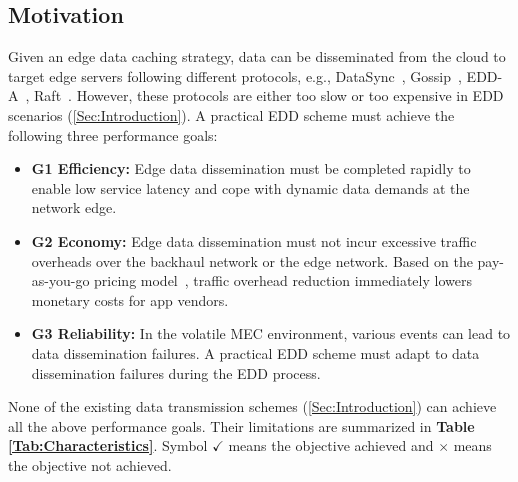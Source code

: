 \documentclass[10pt,journal,compsoc]{IEEEtran}
\begin{document}
\subsection{Motivation}
Given an edge data caching strategy, data can be disseminated from the cloud to target edge servers following different protocols, e.g., DataSync~\cite{datasync2018AWS}, Gossip~\cite{boyd2006randomized}, EDD-A~\cite{xia2021cost}, Raft~\cite{ongaro2014Raft}. However, these protocols are either too slow or too expensive in EDD scenarios (\cref{Sec:Introduction}). A practical EDD scheme must achieve the following three performance goals:
\begin{itemize}
    \item \textbf{G1 Efficiency:} Edge data dissemination must be completed rapidly to enable low service latency and cope with dynamic data demands at the network edge.
    \item \textbf{G2 Economy:} Edge data dissemination must not incur excessive traffic overheads over the backhaul network or the edge network. Based on the pay-as-you-go pricing model~\cite{wang2021eihdp}, traffic overhead reduction immediately lowers monetary costs for app vendors.
    \item \textbf{G3 Reliability:} In the volatile MEC environment, various events can lead to data dissemination failures. A practical EDD scheme must adapt to data dissemination failures during the EDD process.
\end{itemize}

None of the existing data transmission schemes (\cref{Sec:Introduction}) can achieve all the above performance goals. Their limitations are summarized in \textbf{Table \ref{Tab:Characteristics}}. Symbol $\checkmark$ means the objective achieved and $\times$ means the objective not achieved.%
\end{document}
